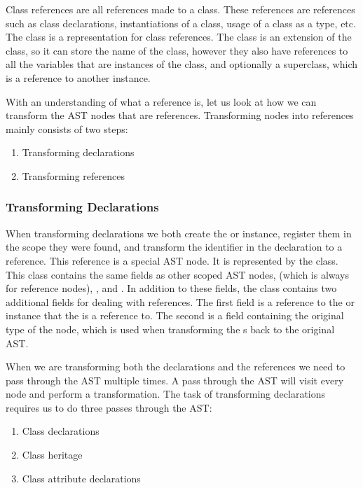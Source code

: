 Class references are all references made to a class.
These references are references such as class declarations, instantiations of a class, usage of a class as a type, etc.
The  class is a representation for class references.
The class is an extension of the  class, so it can store the name of the class, however they also have references to all the variables that are instances of the class, and optionally a superclass, which is a reference to another  instance.

With an understanding of what a reference is, let us look at how we can transform the AST nodes that are references.
Transforming nodes into references mainly consists of two steps:

\begin{enumerate}
    \item Transforming declarations
    \item Transforming references
\end{enumerate}

\subsubsection{Transforming Declarations}

When transforming declarations we both create the  or  instance, register them in the scope they were found, and transform the identifier in the declaration to a reference.
This reference is a special AST node.
It is represented by the  class.
This class contains the same fields as other scoped AST nodes,  (which is always  for reference nodes), ,  and .
In addition to these fields, the  class contains two additional fields for dealing with references.
The first field is a reference to the  or  instance that the  is a reference to.
The second is a field containing the original type of the node, which is used when transforming the s back to the original AST\@.

When we are transforming both the declarations and the references we need to pass through the AST multiple times.
A pass through the AST will visit every node and perform a transformation.
The task of transforming declarations requires us to do three passes through the AST:

\begin{enumerate}
    \item Class declarations
    \item Class heritage
    \item Class attribute declarations
\end{enumerate}

